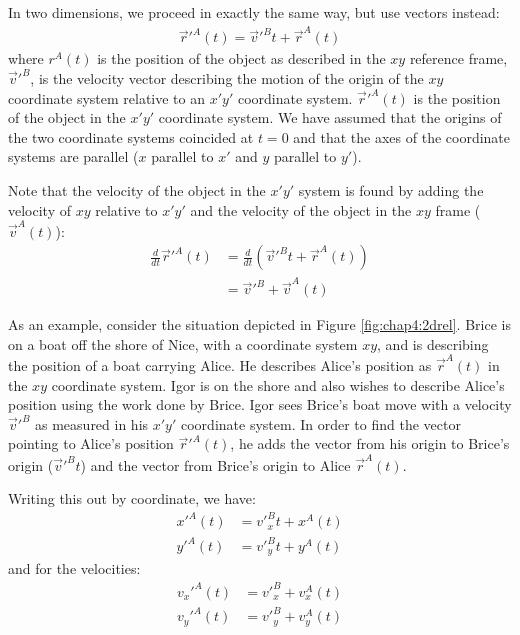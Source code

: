 In two dimensions, we proceed in exactly the same way, but use vectors instead:
\begin{align*}
\vec r'^A(t) = \vec v'^Bt+\vec r^A(t)
\end{align*}
where $r^A(t)$ is the position of the object as described in the $xy$ reference frame, $\vec v'^B$, is the velocity vector describing the motion of the origin of the $xy$ coordinate system relative to an $x'y'$ coordinate system. $\vec r'^A(t)$ is the position of the object in the $x'y'$ coordinate system. We have assumed that the origins of the two coordinate systems coincided at $t=0$ and that the axes of the coordinate systems are parallel ($x$ parallel to $x'$ and $y$ parallel to $y'$).

Note that the velocity of the object in the $x'y'$ system is found by adding the velocity of $xy$ relative to $x'y'$ and the velocity of the object in the $xy$ frame ($\vec v^A(t)$):
\begin{align*}
\frac{d}{dt}\vec r'^A(t) &=\frac{d}{dt}(\vec v'^Bt+\vec r^A(t))\\
&=\vec v'^B+\vec v^A(t)
\end{align*}

As an example, consider the situation depicted in Figure \ref{fig:chap4:2drel}. Brice is on a boat off the shore of Nice, with a coordinate system $xy$, and is describing the position of a boat carrying Alice. He describes Alice's position as $\vec r^A(t)$ in the $xy$ coordinate system. Igor is on the shore and also wishes to describe Alice's position using the work done by Brice. Igor sees Brice's boat move with a velocity $\vec v'^B$ as measured in his $x'y'$ coordinate system. In order to find the vector pointing to Alice's position $\vec r'^A(t)$, he adds the vector from his origin to Brice's origin ($\vec v'^B t$) and the vector from Brice's origin to Alice $\vec r^A(t)$.


Writing this out by coordinate, we have:
\begin{align*}
x'^A(t)&=v'^B_xt+x^A(t)\\
y'^A(t)&=v'^B_yt+y^A(t)
\end{align*}
and for the velocities:
\begin{align*}
v_x'^A(t)&=v'^B_x+v_x^A(t)\\
v_y'^A(t)&=v'^B_y+v_y^A(t)
\end{align*}


